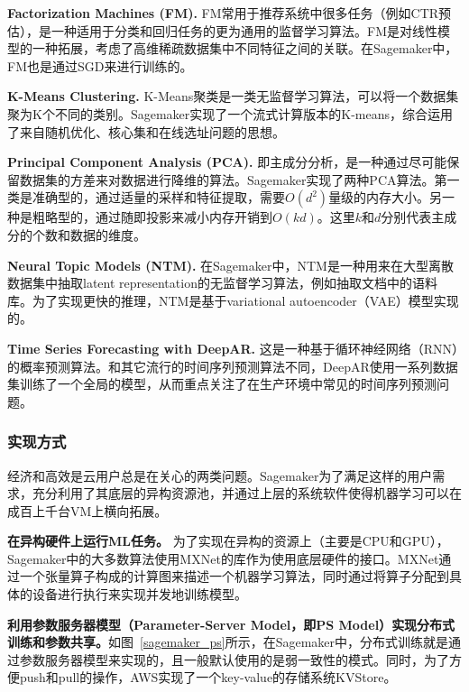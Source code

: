 \textbf{Factorization Machines (FM)\parencite{rendle2010factorization}. }FM常用于推荐系统中很多任务（例如CTR预估），是一种适用于分类和回归任务的更为通用的监督学习算法。FM是对线性模型的一种拓展，考虑了高维稀疏数据集中不同特征之间的关联。在Sagemaker中，FM也是通过SGD来进行训练的。

\textbf{K-Means Clustering\parencite{jain2010data}. }K-Means聚类是一类无监督学习算法，可以将一个数据集聚为K个不同的类别。Sagemaker实现了一个流式计算版本的K-means，综合运用了来自随机优化、核心集和在线选址问题的思想。

\textbf{Principal Component Analysis (PCA).\parencite{tenenbaum2000a} }即主成分分析，是一种通过尽可能保留数据集的方差来对数据进行降维的算法。Sagemaker实现了两种PCA算法。第一类是准确型的，通过适量的采样和特征提取，需要$O(d^2)$量级的内存大小。另一种是粗略型的，通过随即投影来减小内存开销到$O(kd)$。这里$k$和$d$分别代表主成分的个数和数据的维度。

\textbf{Neural Topic Models (NTM). }在Sagemaker中，NTM是一种用来在大型离散数据集中抽取latent representation的无监督学习算法，例如抽取文档中的语料库。为了实现更快的推理，NTM是基于variational autoencoder（VAE）模型实现的。

\textbf{Time Series Forecasting with DeepAR. }这是一种基于循环神经网络（RNN）的概率预测算法。和其它流行的时间序列预测算法不同，DeepAR\parencite{flunkert2020deepar}使用一系列数据集训练了一个全局的模型，从而重点关注了在生产环境中常见的时间序列预测问题。

\subsubsection{实现方式}
经济和高效是云用户总是在关心的两类问题。Sagemaker为了满足这样的用户需求，充分利用了其底层的异构资源池，并通过上层的系统软件使得机器学习可以在成百上千台VM上横向拓展。

\textbf{在异构硬件上运行ML任务。}
为了实现在异构的资源上（主要是CPU和GPU），Sagemaker中的大多数算法使用MXNet\parencite{chen2015mxnet}的库作为使用底层硬件的接口。MXNet通过一个张量算子构成的计算图来描述一个机器学习算法，同时通过将算子分配到具体的设备进行执行来实现并发地训练模型。

\textbf{利用参数服务器模型（Parameter-Server Model，即PS Model）\parencite{186214}实现分布式训练和参数共享。}如图~\ref{sagemaker_ps}所示，在Sagemaker中，分布式训练就是通过参数服务器模型来实现的，且一般默认使用的是弱一致性的模式。同时，为了方便push和pull的操作，AWS实现了一个key-value的存储系统KVStore。

